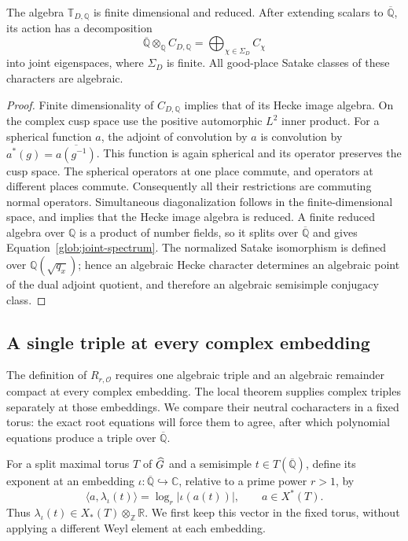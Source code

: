 \begin{lemma}\label{glob:hecke-spectrum}
The algebra $\mathbb T_{D,\mathbb Q}$ is finite dimensional and reduced.
After extending scalars to $\overline{\mathbb Q}$, its action has a
decomposition
\begin{equation}\label{glob:joint-spectrum}
 \overline{\mathbb Q}\otimes_{\mathbb Q}C_{D,\mathbb Q}
   =\bigoplus_{\chi\in\Sigma_D} C_\chi
\end{equation}
into joint eigenspaces, where $\Sigma_D$ is finite.  All good-place
Satake classes of these characters are algebraic.
\end{lemma}

\begin{proof}
Finite dimensionality of $C_{D,\mathbb Q}$ implies that of its Hecke
image algebra.  On the complex cusp space use the positive automorphic
$L^2$ inner product.  For a spherical function $a$, the adjoint of
convolution by $a$ is convolution by
$a^*(g)=\overline{a(g^{-1})}$.  This function is again spherical and
its operator preserves the cusp space.  The spherical operators at
one place commute, and operators at different places commute.
Consequently all their restrictions are commuting normal operators.
Simultaneous diagonalization follows in the finite-dimensional space,
and implies that the Hecke image algebra is reduced.  A finite reduced
algebra over $\mathbb Q$ is a product of number fields, so it splits
over $\overline{\mathbb Q}$ and gives
Equation~\eqref{glob:joint-spectrum}.  The normalized Satake
isomorphism is defined over $\mathbb Q(\sqrt{q_x})$; hence an algebraic
Hecke character determines an algebraic point of the dual adjoint
quotient, and therefore an algebraic semisimple conjugacy class.
\end{proof}

\subsection{A single triple at every complex embedding}

The definition of $R_{r,\mathcal O}$ requires one algebraic triple and
an algebraic remainder compact at every complex embedding.  The local
theorem supplies complex triples separately at those embeddings.  We
compare their neutral cocharacters in a fixed torus: the exact root
equations will force them to agree, after which polynomial equations
produce a triple over $\overline{\mathbb Q}$.

For a split maximal torus $T$ of $\widehat G$ and a semisimple
$t\in T(\overline{\mathbb Q})$, define its exponent at an embedding
$\iota:\overline{\mathbb Q}\hookrightarrow\mathbb C$, relative to a
prime power $r>1$, by
\begin{equation}\label{glob:exponent}
 \langle a,\lambda_\iota(t)\rangle
   =\log_r|\iota(a(t))|,
 \qquad a\in X^*(T).
\end{equation}
Thus $\lambda_\iota(t)\in X_*(T)\otimes_{\mathbb Z}\mathbb R$.
We first keep this vector in the fixed torus, without applying a
different Weyl element at each embedding.

